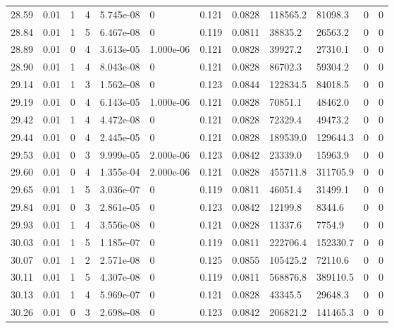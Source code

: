 \documentclass[preview]{standalone}
\begin{document}
{{{{{{{{\begin{tabular}{L{1.2cm}C{1.2cm} C{0.3cm}C{0.5cm} C{1.4cm}C{1.4cm} C{1.4cm}C{1.4cm} C{1.6cm}C{1.6cm} C{1.6cm}C{1.6cm}}
  28.59  &  0.01  & 1     &  4 &  5.745e-08  & 0  &  0.121&   0.0828& 118565.2 & 81098.3   &  0 & 0  \\ 
  28.84  &  0.01  & 1     &  5 &  6.467e-08  & 0  &  0.119&   0.0811& 38835.2 & 26563.2   &  0 & 0  \\ 
  28.89  &  0.01  & 0     &  4 &  3.613e-05  & 1.000e-06  &  0.121&   0.0828& 39927.2 & 27310.1   &  0 & 0  \\ 
  28.90  &  0.01  & 1     &  4 &  8.043e-08  & 0  &  0.121&   0.0828& 86702.3 & 59304.2   &  0 & 0  \\ 
  29.14  &  0.01  & 1     &  3 &  1.562e-08  & 0  &  0.123&   0.0844& 122834.5 & 84018.5   &  0 & 0  \\ 
  29.19  &  0.01  & 0     &  4 &  6.143e-05  & 1.000e-06  &  0.121&   0.0828& 70851.1 & 48462.0   &  0 & 0  \\ 
  29.42  &  0.01  & 1     &  4 &  4.472e-08  & 0  &  0.121&   0.0828& 72329.4 & 49473.2   &  0 & 0  \\ 
  29.44  &  0.01  & 0     &  4 &  2.445e-05  & 0  &  0.121&   0.0828& 189539.0 & 129644.3   &  0 & 0  \\ 
  29.53  &  0.01  & 0     &  3 &  9.999e-05  & 2.000e-06  &  0.123&   0.0842& 23339.0 & 15963.9   &  0 & 0  \\ 
  29.60  &  0.01  & 0     &  4 &  1.355e-04  & 2.000e-06  &  0.121&   0.0828& 455711.8 & 311705.9   &  0 & 0  \\ 
  29.65  &  0.01  & 1     &  5 &  3.036e-07  & 0  &  0.119&   0.0811& 46051.4 & 31499.1   &  0 & 0  \\ 
  29.84  &  0.01  & 0     &  3 &  2.861e-05  & 0  &  0.123&   0.0842& 12199.8 & 8344.6   &  0 & 0  \\ 
  29.93  &  0.01  & 1     &  4 &  3.556e-08  & 0  &  0.121&   0.0828& 11337.6 & 7754.9   &  0 & 0  \\ 
  30.03  &  0.01  & 1     &  5 &  1.185e-07  & 0  &  0.119&   0.0811& 222706.4 & 152330.7   &  0 & 0  \\ 
  30.07  &  0.01  & 1     &  2 &  2.571e-08  & 0  &  0.125&   0.0855& 105425.2 & 72110.6   &  0 & 0  \\ 
  30.11  &  0.01  & 1     &  5 &  4.307e-08  & 0  &  0.119&   0.0811& 568876.8 & 389110.5   &  0 & 0  \\ 
  30.13  &  0.01  & 1     &  4 &  5.969e-07  & 0  &  0.121&   0.0828& 43345.5 & 29648.3   &  0 & 0  \\ 
  30.26  &  0.01  & 0     &  3 &  2.698e-08  & 0  &  0.123&   0.0842& 206821.2 & 141465.3   &  0 & 0  \\ 

\end{tabular}}}}}}}}}
\end{document}
